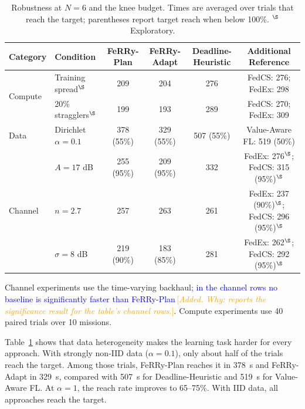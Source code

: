 \documentclass[conference]{IEEEtran}
\newcommand{\sysname}{FeRRy}
\newcommand{\changenote}[1]{\textcolor{orange}{\,[\emph{#1}]}}
\begin{document}
\begin{table}[t]
\centering
\caption{Robustness at \(N=6\) and the knee budget. Times are averaged over
trials that reach the target; parentheses report target reach when below
100\%. \(^{\S}\) Exploratory.}
\label{tab:robustness}
\small
\setlength{\tabcolsep}{5pt}

\begin{tabular}{llcccc}
\hline
\textbf{Category} &
\textbf{Condition} &
\textbf{\sysname{}-Plan} &
\textbf{\sysname{}-Adapt} &
\textbf{Deadline-Heuristic} &
\textbf{Additional Reference} \\
\hline

\multirow{2}{*}{Compute}
& Training spread$^{\S}$
& 209
& 204
& 276
& FedCS: 276; FedEx: 298 \\

& 20\% stragglers$^{\S}$
& 199
& 193
& 289
& FedCS: 270; FedEx: 309 \\
\hline

Data
& Dirichlet \(\alpha=0.1\)
& 378 (55\%)
& 329 (55\%)
& 507 (55\%)
& Value-Aware FL: 519 (50\%) \\
\hline

\multirow{3}{*}{Channel}
& \(A=17\) dB
& 255 (95\%)
& 209 (95\%)
& 332
& FedEx: 276$^{\S}$; FedCS: 315 (95\%)$^{\S}$ \\

& \(n=2.7\)
& 257
& 263
& 261
& FedEx: 237 (90\%)$^{\S}$; FedCS: 296 (95\%)$^{\S}$ \\

& \(\sigma=8\) dB
& 219 (90\%)
& 183 (85\%)
& 281
& FedEx: 262$^{\S}$; FedCS: 292 (95\%)$^{\S}$ \\
\hline
\end{tabular}

\vspace{2pt}
\footnotesize
Channel experiments use the time-varying backhaul\textcolor{blue}{; in the channel
rows no baseline is significantly faster than \sysname{}-Plan}\changenote{Added. Why: reports the significance result for the table's channel rows.}. Compute experiments use
40 paired trials over 10 missions.
\end{table}

Table~\ref{tab:robustness} shows that data heterogeneity makes the learning task
harder for every approach. With strongly non-IID data
(\(\alpha=0.1\)), only about half of the trials reach the target. Among those
trials, \sysname{}-Plan reaches it in 378~s and \sysname{}-Adapt in 329~s,
compared with 507~s for Deadline-Heuristic and 519~s for Value-Aware FL.
At \(\alpha=1\), the reach rate improves to 65--75\%. With IID data, all
approaches reach the target.
\end{document}
